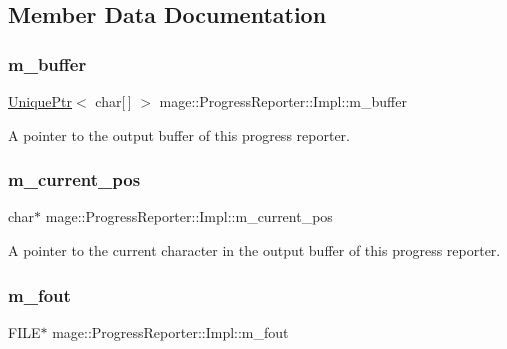 \subsection{Member Data Documentation}
\hypertarget{classmage_1_1_progress_reporter_1_1_impl_a0ae90634d05295f7c1a8294e343418e2}{}\label{classmage_1_1_progress_reporter_1_1_impl_a0ae90634d05295f7c1a8294e343418e2} 
\subsubsection{\texorpdfstring{m\+\_\+buffer}{m\_buffer}}
{\footnotesize\ttfamily \hyperlink{namespacemage_a3316d7143a973e37adf1110f2e80ca31}{Unique\+Ptr}$<$ char\mbox{[}$\,$\mbox{]} $>$ mage\+::\+Progress\+Reporter\+::\+Impl\+::m\+\_\+buffer\hspace{0.3cm}{\ttfamily [private]}}

A pointer to the output buffer of this progress reporter. \hypertarget{classmage_1_1_progress_reporter_1_1_impl_ab1513044548160ad7a6d181ae2618f1b}{}\label{classmage_1_1_progress_reporter_1_1_impl_ab1513044548160ad7a6d181ae2618f1b} 
\subsubsection{\texorpdfstring{m\+\_\+current\+\_\+pos}{m\_current\_pos}}
{\footnotesize\ttfamily char$\ast$ mage\+::\+Progress\+Reporter\+::\+Impl\+::m\+\_\+current\+\_\+pos\hspace{0.3cm}{\ttfamily [private]}}

A pointer to the current character in the output buffer of this progress reporter. \hypertarget{classmage_1_1_progress_reporter_1_1_impl_a1ef149837131c4c615a4be082605f62c}{}\label{classmage_1_1_progress_reporter_1_1_impl_a1ef149837131c4c615a4be082605f62c} 
\subsubsection{\texorpdfstring{m\+\_\+fout}{m\_fout}}
{\footnotesize\ttfamily F\+I\+LE$\ast$ mage\+::\+Progress\+Reporter\+::\+Impl\+::m\+\_\+fout\hspace{0.3cm}{\ttfamily [private]}}

